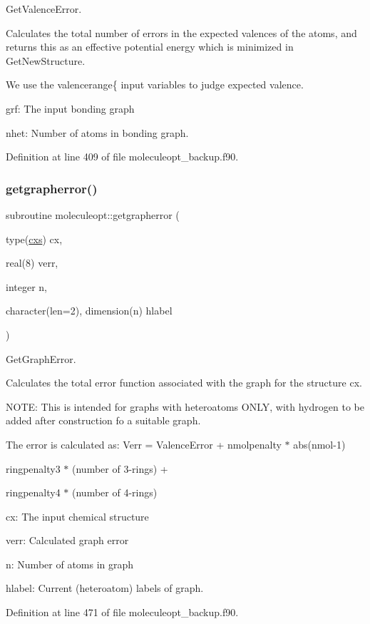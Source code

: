 Get\+Valence\+Error. 

Calculates the total number of errors in the expected valences of the atoms, and returns this as an effective potential energy which is minimized in Get\+New\+Structure.

We use the \textquotesingle{}valencerange\{\textquotesingle{} input variables to judge expected valence.


\begin{DoxyItemize}
\item grf\+: The input bonding graph
\item nhet\+: Number of atoms in bonding graph. 
\end{DoxyItemize}

Definition at line 409 of file moleculeopt\+\_\+backup.\+f90.

\mbox{\label{namespacemoleculeopt_ab9da6f6b497ab4befdca8b3ee35b4730}} 
\subsubsection{\texorpdfstring{getgrapherror()}{getgrapherror()}\hspace{0.1cm}{\footnotesize\ttfamily [2/2]}}
{\footnotesize\ttfamily subroutine moleculeopt\+::getgrapherror (\begin{DoxyParamCaption}\item[{type(\mbox{\hyperlink{structchemstr_1_1cxs}{cxs}})}]{cx,  }\item[{real(8)}]{verr,  }\item[{integer}]{n,  }\item[{character(len=2), dimension(n)}]{hlabel }\end{DoxyParamCaption})}



Get\+Graph\+Error. 

Calculates the total error function associated with the graph for the structure cx.

N\+O\+TE\+: This is intended for graphs with heteroatoms O\+N\+LY, with hydrogen to be added after construction fo a suitable graph.

The error is calculated as\+: Verr = Valence\+Error + nmolpenalty $\ast$ abs(nmol-\/1)
\begin{DoxyItemize}
\item ringpenalty3 $\ast$ (number of 3-\/rings) +
\item ringpenalty4 $\ast$ (number of 4-\/rings)
\end{DoxyItemize}

cx\+: The input chemical structure
\begin{DoxyItemize}
\item verr\+: Calculated graph error
\item n\+: Number of atoms in graph
\item hlabel\+: Current (heteroatom) labels of graph. 
\end{DoxyItemize}

Definition at line 471 of file moleculeopt\+\_\+backup.\+f90.

